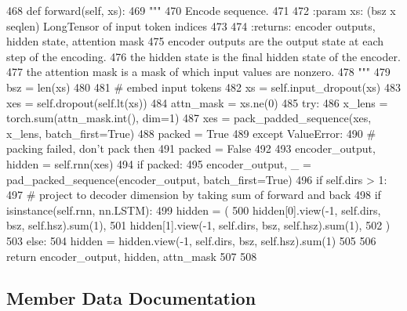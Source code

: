 \begin{DoxyCode}
468     \textcolor{keyword}{def }forward(self, xs):
469         \textcolor{stringliteral}{"""}
470 \textcolor{stringliteral}{        Encode sequence.}
471 \textcolor{stringliteral}{}
472 \textcolor{stringliteral}{        :param xs: (bsz x seqlen) LongTensor of input token indices}
473 \textcolor{stringliteral}{}
474 \textcolor{stringliteral}{        :returns: encoder outputs, hidden state, attention mask}
475 \textcolor{stringliteral}{            encoder outputs are the output state at each step of the encoding.}
476 \textcolor{stringliteral}{            the hidden state is the final hidden state of the encoder.}
477 \textcolor{stringliteral}{            the attention mask is a mask of which input values are nonzero.}
478 \textcolor{stringliteral}{        """}
479         bsz = len(xs)
480 
481         \textcolor{comment}{# embed input tokens}
482         xs = self.input\_dropout(xs)
483         xes = self.dropout(self.lt(xs))
484         attn\_mask = xs.ne(0)
485         \textcolor{keywordflow}{try}:
486             x\_lens = torch.sum(attn\_mask.int(), dim=1)
487             xes = pack\_padded\_sequence(xes, x\_lens, batch\_first=\textcolor{keyword}{True})
488             packed = \textcolor{keyword}{True}
489         \textcolor{keywordflow}{except} ValueError:
490             \textcolor{comment}{# packing failed, don't pack then}
491             packed = \textcolor{keyword}{False}
492 
493         encoder\_output, hidden = self.rnn(xes)
494         \textcolor{keywordflow}{if} packed:
495             encoder\_output, \_ = pad\_packed\_sequence(encoder\_output, batch\_first=\textcolor{keyword}{True})
496         \textcolor{keywordflow}{if} self.dirs > 1:
497             \textcolor{comment}{# project to decoder dimension by taking sum of forward and back}
498             \textcolor{keywordflow}{if} isinstance(self.rnn, nn.LSTM):
499                 hidden = (
500                     hidden[0].view(-1, self.dirs, bsz, self.hsz).sum(1),
501                     hidden[1].view(-1, self.dirs, bsz, self.hsz).sum(1),
502                 )
503             \textcolor{keywordflow}{else}:
504                 hidden = hidden.view(-1, self.dirs, bsz, self.hsz).sum(1)
505 
506         \textcolor{keywordflow}{return} encoder\_output, hidden, attn\_mask
507 
508 
\end{DoxyCode}


\subsection{Member Data Documentation}
\mbox{\label{classparlai_1_1agents_1_1legacy__agents_1_1seq2seq_1_1modules__v1_1_1RNNEncoder_ada15894988a4d904594a3ae557bb16a2}} 
